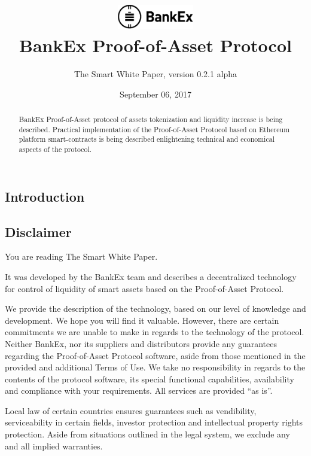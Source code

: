 \documentclass{article}
\title{\vspace{-3.85em}\includegraphics[width=0.25\textwidth]{logo.pdf} \\ \vspace{24pt} BankEx Proof-of-Asset Protocol}
\author{The Smart White Paper, version 0.2.1 alpha}
\date{September 06, 2017}
\begin{document}
\maketitle

\begin{abstract}
BankEx Proof-of-Asset protocol of assets tokenization and liquidity increase is being described. Practical implementation of the Proof-of-Asset Protocol based on Ethereum platform smart-contracts is being described enlightening technical and economical aspects of the protocol.
\end{abstract}

\vspace{24pt}

\begin{multicols}{2}

\tableofcontents

\section{Introduction}

\subsection{Disclaimer}

You are reading The Smart White Paper.

It was developed by the BankEx team and describes a decentralized technology for control of liquidity of smart assets based on the Proof-of-Asset Protocol.
	
We provide the description of the technology, based on our level of knowledge and development. We hope you will find it valuable. However, there are certain commitments we are unable to make in regards to the technology of the protocol.  
Neither BankEx, nor its suppliers and distributors provide any guarantees regarding the Proof-of-Asset Protocol software, aside from those mentioned in the provided and additional Terms of Use. We take no responsibility in regards to the contents of the protocol software, its special functional capabilities, availability and compliance with your requirements. All services are provided \enquote{as is}.

Local law of certain countries ensures guarantees such as vendibility, serviceability in certain fields, investor protection and intellectual property rights protection. Aside from situations outlined in the legal system, we exclude any and all implied warranties.


\end{multicols}
\end{document}
